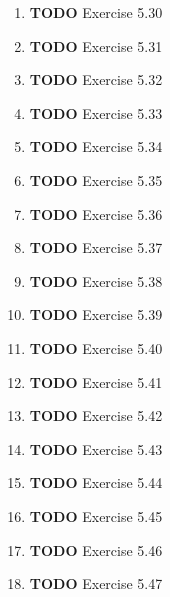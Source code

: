 \documentclass[11pt]{article}
\begin{document}
\begin{enumerate}
\begin{enumerate}
\item {\bfseries\sffamily TODO} Exercise 5.30
\label{sec:org5a455b3}

\item {\bfseries\sffamily TODO} Exercise 5.31
\label{sec:orgaf12bdc}

\item {\bfseries\sffamily TODO} Exercise 5.32
\label{sec:orge7fa1ae}

\item {\bfseries\sffamily TODO} Exercise 5.33
\label{sec:orge278d28}

\item {\bfseries\sffamily TODO} Exercise 5.34
\label{sec:orgb0ad8ee}

\item {\bfseries\sffamily TODO} Exercise 5.35
\label{sec:org5ff9236}

\item {\bfseries\sffamily TODO} Exercise 5.36
\label{sec:orgbb53bc2}

\item {\bfseries\sffamily TODO} Exercise 5.37
\label{sec:org8db5150}

\item {\bfseries\sffamily TODO} Exercise 5.38
\label{sec:orge96a1e9}

\item {\bfseries\sffamily TODO} Exercise 5.39
\label{sec:org0d68332}

\item {\bfseries\sffamily TODO} Exercise 5.40
\label{sec:org12730b0}

\item {\bfseries\sffamily TODO} Exercise 5.41
\label{sec:org51ea0bf}

\item {\bfseries\sffamily TODO} Exercise 5.42
\label{sec:org91f0cce}

\item {\bfseries\sffamily TODO} Exercise 5.43
\label{sec:orgc83ca5d}

\item {\bfseries\sffamily TODO} Exercise 5.44
\label{sec:org49f6fca}

\item {\bfseries\sffamily TODO} Exercise 5.45
\label{sec:org75abc2b}

\item {\bfseries\sffamily TODO} Exercise 5.46
\label{sec:orga665d4e}

\item {\bfseries\sffamily TODO} Exercise 5.47
\label{sec:org00f1294}


\end{enumerate}
\end{enumerate}
\end{document}
